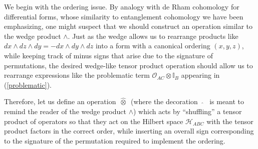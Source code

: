 \documentclass[12pt]{article}
\newcommand{\wotimes}{ \, \widehat{\otimes} \, }
\numberwithin{equation}{section}
\begin{document}
We begin with the ordering issue. By analogy with de Rham cohomology for differential forms, whose similarity to entanglement cohomology we have been emphasizing, one might suspect that we should construct an operation similar to the wedge product $\wedge$. Just as the wedge allows us to rearrange products like $dx \wedge dz \wedge dy = - dx \wedge dy \wedge dz$ into a form with a canonical ordering $(x, y, z)$, while keeping track of minus signs that arise due to the signature of permutations, the desired wedge-like tensor product operation should allow us to rearrange expressions like the problematic term $\mathcal{O}_{AC} \otimes \mathbb{I}_B$ appearing in (\ref{problematic}).

Therefore, let us define an operation $\wotimes$ (where the decoration \, $\widehat{ {} }$ \, is meant to remind the reader of the wedge product $\wedge$) which acts by ``shuffling'' a tensor product of operators so that they act on the Hilbert space $\mathcal{H}_{ABC}$ with the tensor product factors in the correct order, while inserting an overall sign corresponding to the signature of the permutation required to implement the ordering.
\end{document}
